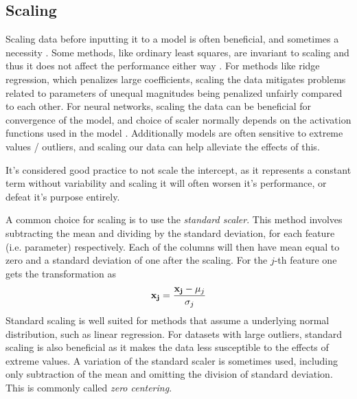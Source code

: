 
\subsection{Scaling}\label{sec:scale}
Scaling data before inputting it to a model is often beneficial, and sometimes a necessity \citep[Linear Regression]{morten}. Some methods, like ordinary least squares, are invariant to scaling and thus it does not affect the performance either way . For methods like ridge regression, which penalizes large coefficients, scaling the data mitigates problems related to parameters of unequal magnitudes being penalized unfairly compared to each other. For neural networks, scaling the data can be beneficial for convergence of the model, and choice of scaler normally depends on the activation functions used in the model \citep[Ch.7]{Goodfellow-et-al-2016}. Additionally models are often sensitive to extreme values / outliers, and scaling our data can help alleviate the effects of this. 

It's considered good practice to not scale the intercept, as it represents a constant term without variability and scaling it will often worsen it's performance, or defeat it's purpose entirely.

A common choice for scaling is to use the \textit{standard scaler}. This method involves subtracting the mean and dividing by the standard deviation, for each feature (i.e. parameter) respectively. Each of the columns will then have mean equal to zero and a standard deviation of one after the scaling. For the $j$-th feature one gets the transformation as 
\begin{equation}\label{standardize}
    \bold{x_j} = \frac{\bold{x_j}-\mu_j}{\sigma_{j}}
\end{equation}
Standard scaling is well suited for methods that assume a underlying normal distribution, such as linear regression. For datasets with large outliers, standard scaling is also beneficial as it makes the data less susceptible to the effects of extreme values.
A variation of the standard scaler is sometimes used, including only subtraction of the mean and omitting the division of standard deviation. This is commonly called \textit{zero centering}. 

